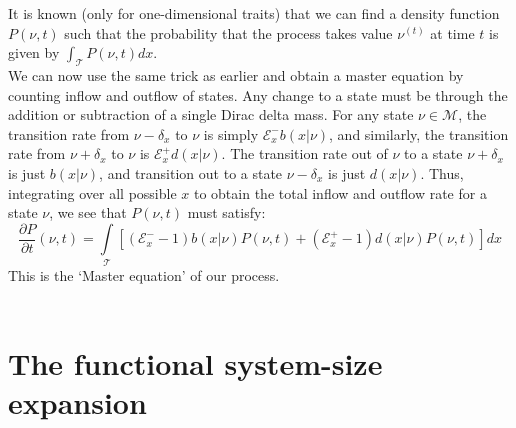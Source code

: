 It is known (only for one-dimensional traits) that we can find a density function $P(\nu,t)$ such that the probability that the process takes value $\nu^{(t)}$ at time $t$ is given by $\int_{\mathcal{T}}P(\nu,t)dx$.\\
We can now use the same trick as earlier and obtain a master equation by counting inflow and outflow of states. Any change to a state must be through the addition or subtraction of a single Dirac delta mass. For any state $\nu \in \mathcal{M}$, the transition rate from $\nu - \delta_{x}$ to $\nu$ is simply $\mathcal{E}^{-}_{x}b(x|\nu)$, and similarly, the transition rate from $\nu+\delta_{x}$ to $\nu$ is $\mathcal{E}^{+}_{x}d(x|\nu)$. The transition rate out of $\nu$ to a state $\nu+\delta_x$ is just $b(x|\nu)$, and transition out to a state $\nu - \delta_x$ is just $d(x|\nu)$. Thus, integrating over all possible $x$ to obtain the total inflow and outflow rate for a state $\nu$, we see that $P(\nu,t)$ must satisfy:
\begin{equation}
\label{unnormalized_M_equation}
    \frac{\partial P}{\partial t}(\nu,t) = \int\limits_{\mathcal{T}}\left[(\mathcal{E}^{-}_{x}-1)b(x|\nu)P(\nu,t) + (\mathcal{E}^{+}_{x}-1)d(x|\nu)P(\nu,t)\right]dx
\end{equation}
This is the `Master equation' of our process.\\
\\
\section{The functional system-size expansion}

